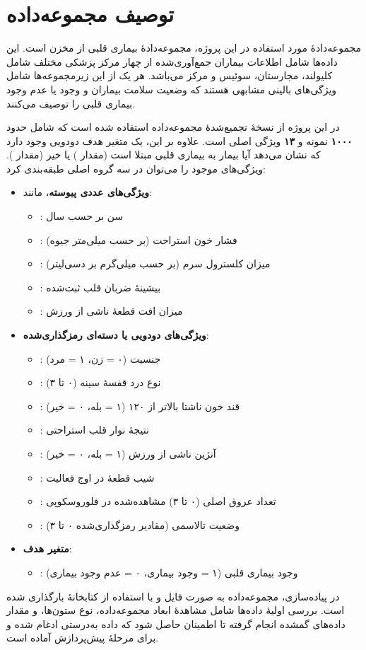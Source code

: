 \section{توصیف مجموعه‌داده}

مجموعه‌دادهٔ مورد استفاده در این پروژه، مجموعه‌دادهٔ بیماری قلبی از مخزن
 \cite{uci} است. این داده‌ها شامل اطلاعات بیماران
جمع‌آوری‌شده از چهار مرکز پزشکی مختلف شامل کلیولند، مجارستان، سوئیس و مرکز 
می‌باشد. هر یک از این زیرمجموعه‌ها شامل ویژگی‌های بالینی مشابهی هستند که وضعیت سلامت بیماران
و وجود یا عدم وجود بیماری قلبی را توصیف می‌کنند.

در این پروژه از نسخهٔ تجمیع‌شدهٔ مجموعه‌داده استفاده شده است که شامل حدود \textbf{۱۰۰۰}
نمونه و \textbf{۱۳} ویژگی اصلی است. علاوه بر این، یک متغیر هدف دودویی وجود دارد که نشان می‌دهد
آیا بیمار به بیماری قلبی مبتلا است (مقدار ) یا خیر (مقدار ). ویژگی‌های موجود را
می‌توان در سه گروه اصلی طبقه‌بندی کرد:

\begin{itemize}
	\item \textbf{ویژگی‌های عددی پیوسته}، مانند:
	\begin{itemize}
		\item {}: سن بر حسب سال
		\item {}: فشار خون استراحت (بر حسب میلی‌متر جیوه)
		\item {}: میزان کلسترول سرم (بر حسب میلی‌گرم بر دسی‌لیتر)
		\item {}: بیشینهٔ ضربان قلب ثبت‌شده
		\item {}: میزان افت قطعهٔ  ناشی از ورزش
	\end{itemize}
	
	\item \textbf{ویژگی‌های دودویی یا دسته‌ای رمزگذاری‌شده}:
	\begin{itemize}
		\item {}: جنسیت (۰ = زن، ۱ = مرد)
		\item {}: نوع درد قفسهٔ سینه (۰ تا ۳)
		\item {}: قند خون ناشتا بالاتر از ۱۲۰ (۱ = بله، ۰ = خیر)
		\item {}: نتیجهٔ نوار قلب استراحتی
		\item {}: آنژین ناشی از ورزش (۱ = بله، ۰ = خیر)
		\item {}: شیب قطعهٔ  در اوج فعالیت
		\item {}: تعداد عروق اصلی (۰ تا ۳) مشاهده‌شده در فلوروسکوپی
		\item {}: وضعیت تالاسمی (مقادیر رمزگذاری‌شده ۰ تا ۳)
	\end{itemize}
	
	\item \textbf{متغیر هدف}:
	\begin{itemize}
		\item {}: وجود بیماری قلبی (۱ = وجود بیماری، ۰ = عدم وجود بیماری)
	\end{itemize}
\end{itemize}

در پیاده‌سازی، مجموعه‌داده به صورت فایل  و با استفاده از کتابخانهٔ 
بارگذاری شده است. بررسی اولیهٔ داده‌ها شامل مشاهدهٔ ابعاد مجموعه‌داده، نوع ستون‌ها، و مقدار
داده‌های گمشده انجام گرفته تا اطمینان حاصل شود که داده به‌درستی ادغام شده و برای مرحلهٔ
پیش‌پردازش آماده است.